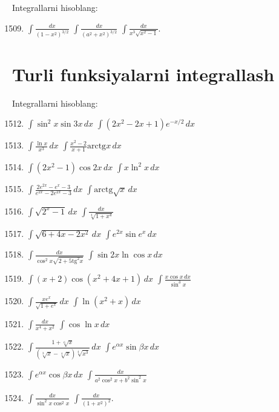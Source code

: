 Integrallarni hisoblang:
\begin{enumerate}\setcounter{enumi}{1508}
	\item $\int\frac{dx}{(1-x^2)^{3/2}}$
	\inlineitem $\int\frac{dx}{(a^2+x^2)^{3/2}}$
	\inlineitem $\int\frac{dx}{x^3\sqrt{x^2-1}}$.
\end{enumerate}

\section{Turli funksiyalarni integrallash}
Integrallarni hisoblang:
\begin{enumerate}\setcounter{enumi}{1511}
	\item $\int\sin^2x\sin 3x\,dx$
	\inlineitem $\int(2x^2-2x+1)e^{-x/2}\,dx$
	
	\item $\int\frac{\ln x}{x^3}\,dx$
	\inlineitem $\int \frac{x^2-2}{x+1}\textrm{arctg}x\,dx$
	
	\item $\int(2x^2-1)\cos 2x\,dx$
	\inlineitem $\int x\ln^2 x\,dx$
	
	\item $\int\frac{2e^{2x}-e^x-3}{e^{2x}-2e^{2x}-3}\,dx$
	\inlineitem $\int\textrm{arctg}\sqrt{x}\,dx$
	
	\item $\int\sqrt{2^x-1}\,dx$
	\inlineitem $\int\frac{dx}{\sqrt[4]{1+x^4}}$
	
	\item $\int\sqrt{6+4x-2x^2}\,dx$
	\inlineitem $\int e^{2x}\sin e^{x}\,dx$
	
	\item $\int\frac{dx}{\cos^2x\sqrt{2+5\textrm{tg}^2x}}$
	\inlineitem $\int\sin 2x\ln\cos x\,dx$
	
	\item $\int(x+2)\cos(x^2+4x+1)\,dx$
	\inlineitem $\int\frac{x\cos x\,dx}{\sin^3x}$
	
	\item $\int\frac{xe^x}{\sqrt{1+e^x}}\,dx$
	\inlineitem $\int\ln(x^2+x)\,dx$
	
	\item $\int\frac{dx}{x^4+x^2}$
	\inlineitem $\int\cos\ln x\,dx$
	
	\item $\int\frac{1+\sqrt[6]{x}}{(\sqrt[3]{x}-\sqrt[4]{x})\sqrt[4]{x^3}}\,dx$
	\inlineitem $\int e^{\alpha x}\sin\beta x\,dx$
	
	\item $\int e^{\alpha x}\cos\beta x\,dx$
	\inlineitem $\int\frac{dx}{a^2\cos^2x+b^2\sin^2x}$
	
	\item $\int\frac{dx}{\sin^2x\cos^2x}$
	\inlineitem $\int\frac{dx}{(1+x^2)^2}$.	
\end{enumerate}
